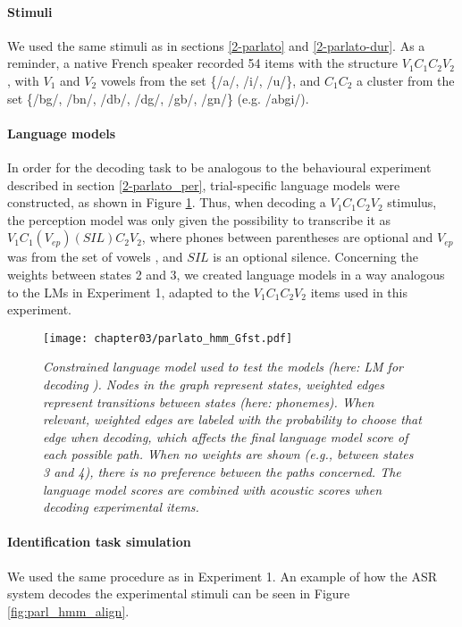 {\paragraph{Stimuli}
We used the same stimuli as in sections \ref{2-parlato} and \ref{2-parlato-dur}. As a reminder, a native French speaker recorded 54 items with the structure $V_{1}C_{1}C_{2}V_{2}$, with $V_{1}$ and $V_{2}$ vowels from the set \{/a/, /i/, /u/\}, and $C_{1}C_{2}$ a cluster from the set \{/bg/, /bn/, /db/, /dg/, /gb/, /gn/\} (e.g. /abgi/).

\paragraph{Language models}

In order for the decoding task to be analogous to the behavioural experiment described in section \ref{2-parlato_per}, trial-specific language models were constructed, as shown in Figure \ref{fig:parlato_G}. Thus, when decoding a $V_{1}C_{1}C_{2}V_{2}$ stimulus, the perception model was only given the possibility to transcribe it as $V_{1}C_{1}(V_{ep})(SIL)C_{2}V_{2}$, where phones between parentheses are optional and $V_{ep}$ was from the set of vowels , and $SIL$ is an optional silence. Concerning the weights between states 2 and 3, we created language models in a way analogous to the LMs in Experiment 1, adapted to the $V_{1}C_{1}C_{2}V_{2}$ items used in this experiment.

\begin{figure}[htb]
\centering
\texttt{[image: chapter03/parlato\_hmm\_Gfst.pdf]}
\caption{\textit{Constrained language model used to test the models (here: LM for decoding ). Nodes in the graph represent states, weighted edges represent transitions between states (here: phonemes). When relevant, weighted edges are labeled with the probability to choose that edge when decoding, which affects the final language model score of each possible path. When no weights are shown (e.g., between states 3 and 4), there is no preference between the paths concerned. The language model scores are combined with acoustic scores when decoding experimental items.
}}
\label{fig:parlato_G}
\end{figure}

\paragraph{Identification task simulation}
We used the same procedure as in Experiment 1. An example of how the ASR system decodes the experimental stimuli can be seen in Figure \ref{fig:parl_hmm_align}. 

}
